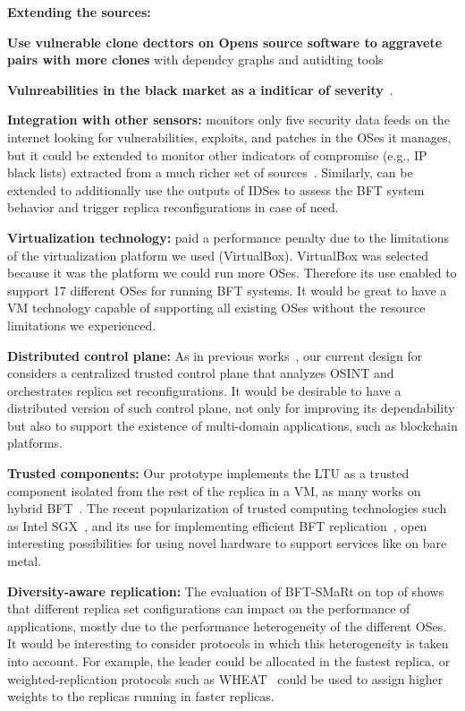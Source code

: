 \textbf{Extending the \system sources:}


\textbf{Use vulnerable clone decttors on Opens source software to aggravete pairs with more clones} with dependcy graphs and autidting tools~\cite{Kim:2017}


\textbf{Vulnreabilities in the black market as a inditicar of severity}~\cite{Allodi:2014}.


\textbf{Integration with other sensors:}
\system monitors only five security data feeds on the internet looking for vulnerabilities, exploits, and patches in the OSes it manages, but it could be extended to monitor other indicators of compromise (e.g., IP black lists) extracted from a much richer set of sources~\cite{Liao:2016,Sabottke:2015}.
Similarly, \system can be extended to additionally use the outputs of IDSes to assess the BFT system behavior and trigger replica reconfigurations in case of need.



\textbf{Virtualization technology:}
\system paid a performance penalty due to the limitations of the virtualization platform we used (VirtualBox).
VirtualBox was selected because it was the platform we could run more OSes.
Therefore its use enabled \system to support 17 different OSes for running BFT systems.
It would be great to have a VM technology capable of supporting all existing OSes without the resource limitations we experienced.

\textbf{Distributed control plane:}
As in previous works~\cite{Roeder:2010,Platania:2014}, our current design for \system considers a centralized trusted control plane that analyzes OSINT and orchestrates replica set reconfigurations.
It would be desirable to have a distributed version of such control plane, not only for improving its dependability but also to support the existence of multi-domain applications, such as blockchain platforms.

\textbf{Trusted components:}
Our prototype implements the LTU as a trusted component isolated from the rest of the replica in a VM, as many works on hybrid BFT~\cite{Veronese:2013,Roeder:2010,Platania:2014,Sousa:2010,Distler:2011}.
The recent popularization of trusted computing technologies such as Intel SGX~\cite{sgx}, and its use for implementing efficient BFT replication~\cite{Behl:2017}, open interesting possibilities for using novel hardware to support services like \system on bare metal.



\textbf{Diversity-aware replication:}
The evaluation of BFT-SMaRt on top of \system shows that different replica set configurations can impact on the performance of applications, mostly due to the performance heterogeneity of the different OSes.
It would be interesting to consider protocols in which this heterogeneity is taken into account.
For example, the leader could be allocated in the fastest replica, or weighted-replication protocols such as WHEAT~\cite{Sousa:2015} could be used to assign higher weights to the replicas running in faster replicas.

